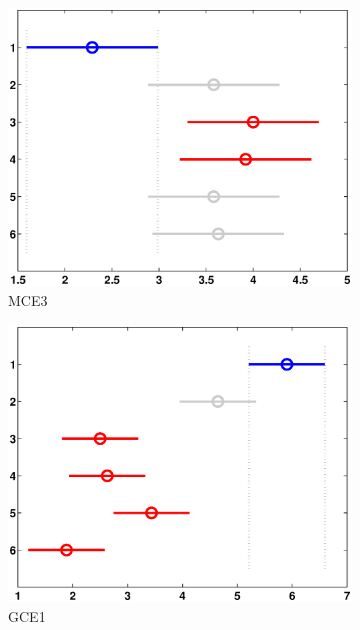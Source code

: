 \begin{figure}
\begin{subfigure}[b]{0.49\linewidth}
		\includegraphics[width=\linewidth]{Figures/C-Bonferroni_HNMED_VS_ED3}
		\caption{MCE3} \label{fig:Bon_M3} 
	\end{subfigure}
	\begin{subfigure}[b]{0.49\linewidth}
		\includegraphics[width=\linewidth]{Figures/C-Bonferroni_HNMED_VS_ED4}
		\caption{GCE1} \label{fig:Bon_G1} 
	\end{subfigure}
	\begin{subfigure}[b]{0.49\linewidth}

\end{subfigure}
\end{figure}
